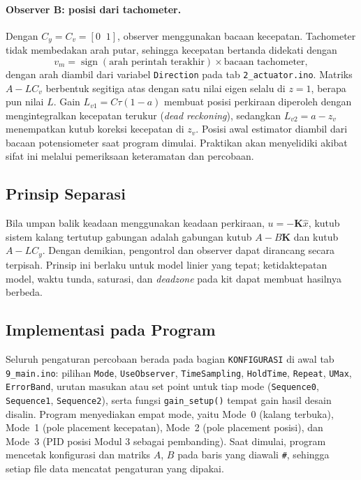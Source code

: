 \documentclass[11pt,a4paper]{article}
\newcommand{\prog}[1]{\texttt{#1}}
\begin{document}
\paragraph{Observer B: posisi dari tachometer.} Dengan $C_y = C_v = [0\;\;1]$, observer menggunakan bacaan kecepatan. Tachometer tidak membedakan arah putar, sehingga kecepatan bertanda didekati dengan
\begin{equation}
v_m = \operatorname{sign}(\text{arah perintah terakhir}) \times \text{bacaan tachometer},
\label{eq:kecepatan_bertanda}
\end{equation}
dengan arah diambil dari variabel \texttt{Direction} pada tab \prog{2\_actuator.ino}. Matriks $A - L C_v$ berbentuk segitiga atas dengan satu nilai eigen selalu di $z = 1$, berapa pun nilai $L$. Gain $L_{v1} = C\tau(1-a)$ membuat posisi perkiraan diperoleh dengan mengintegralkan kecepatan terukur (\textit{dead reckoning}), sedangkan $L_{v2} = a - z_v$ menempatkan kutub koreksi kecepatan di $z_v$. Posisi awal estimator diambil dari bacaan potensiometer saat program dimulai. Praktikan akan menyelidiki akibat sifat ini melalui pemeriksaan keteramatan dan percobaan.

\subsection{Prinsip Separasi}
Bila umpan balik keadaan menggunakan keadaan perkiraan, $u = -\mathbf{K}\hat{x}$, kutub sistem kalang tertutup gabungan adalah gabungan kutub $A - B\mathbf{K}$ dan kutub $A - LC_y$. Dengan demikian, pengontrol dan observer dapat dirancang secara terpisah. Prinsip ini berlaku untuk model linier yang tepat; ketidaktepatan model, waktu tunda, saturasi, dan \textit{deadzone} pada kit dapat membuat hasilnya berbeda.

\subsection{Implementasi pada Program}
Seluruh pengaturan percobaan berada pada bagian \texttt{KONFIGURASI} di awal tab \prog{9\_main.ino}: pilihan \texttt{Mode}, \texttt{UseObserver}, \texttt{TimeSampling}, \texttt{HoldTime}, \texttt{Repeat}, \texttt{UMax}, \texttt{ErrorBand}, urutan masukan atau set point untuk tiap mode (\texttt{Sequence0}, \texttt{Sequence1}, \texttt{Sequence2}), serta fungsi \texttt{gain\_setup()} tempat gain hasil desain disalin. Program menyediakan empat mode, yaitu Mode~0 (kalang terbuka), Mode~1 (pole placement kecepatan), Mode~2 (pole placement posisi), dan Mode~3 (PID posisi Modul 3 sebagai pembanding). Saat dimulai, program mencetak konfigurasi dan matriks $A$, $B$ pada baris yang diawali \texttt{\#}, sehingga setiap file data mencatat pengaturan yang dipakai.
\end{document}
